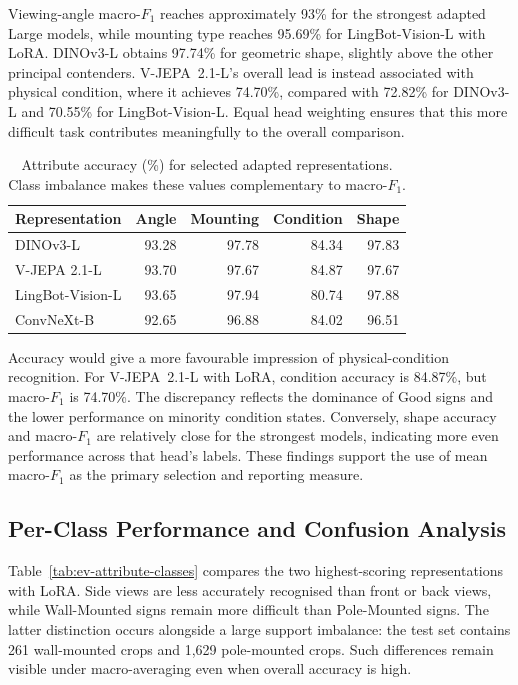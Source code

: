 Viewing-angle macro-\(F_1\) reaches approximately 93\% for the strongest adapted Large models, while mounting type reaches 95.69\% for LingBot-Vision-L with \gls{LoRA}. DINOv3-L obtains 97.74\% for geometric shape, slightly above the other principal contenders. V-JEPA~2.1-L's overall lead is instead associated with physical condition, where it achieves 74.70\%, compared with 72.82\% for DINOv3-L and 70.55\% for LingBot-Vision-L. Equal head weighting ensures that this more difficult task contributes meaningfully to the overall comparison.

\begin{table}[htbp]
\centering
\small
\caption{Attribute accuracy (\%) for selected adapted representations. Class imbalance makes these values complementary to macro-$F_1$.}
\label{tab:ev-attribute-accuracy}
\renewcommand{\arraystretch}{1.15}
\begin{tabularx}{\textwidth}{@{}>{\raggedright\arraybackslash}Xrrrr@{}}
\toprule
Representation & Angle & Mounting & Condition & Shape \\
\midrule
DINOv3-L & 93.28 & 97.78 & 84.34 & 97.83 \\
V-JEPA 2.1-L & 93.70 & 97.67 & 84.87 & 97.67 \\
LingBot-Vision-L & 93.65 & 97.94 & 80.74 & 97.88 \\
ConvNeXt-B & 92.65 & 96.88 & 84.02 & 96.51 \\
\bottomrule
\end{tabularx}
\end{table}


Accuracy would give a more favourable impression of physical-condition recognition. For V-JEPA~2.1-L with \gls{LoRA}, condition accuracy is 84.87\%, but macro-\(F_1\) is 74.70\%. The discrepancy reflects the dominance of Good signs and the lower performance on minority condition states. Conversely, shape accuracy and macro-\(F_1\) are relatively close for the strongest models, indicating more even performance across that head's labels. These findings support the use of mean macro-\(F_1\) as the primary selection and reporting measure.

\subsection{Per-Class Performance and Confusion Analysis}
\label{sec:ev-attribute-confusion}
Table~\ref{tab:ev-attribute-classes} compares the two highest-scoring representations with \gls{LoRA}. Side views are less accurately recognised than front or back views, while Wall-Mounted signs remain more difficult than Pole-Mounted signs. The latter distinction occurs alongside a large support imbalance: the test set contains 261 wall-mounted crops and 1,629 pole-mounted crops. Such differences remain visible under macro-averaging even when overall accuracy is high.

